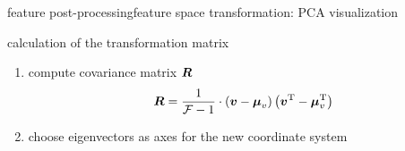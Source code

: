 		\begin{frame}{feature post-processing}{feature space transformation: PCA visualization}
			
			\vspace{-5mm}
			\pause
			calculation of the transformation matrix
			\begin{enumerate}
				\item	compute covariance matrix $\mat{R}$
					\begin{equation*}
						\mat{R} = \frac{1}{\mathcal{F}-1}\cdot \left(\vec{v} - \vec{\mu}_v\right)\left(\vec{v}^\mathrm{T} - \vec{\mu}^\mathrm{T}_v\right)
					\end{equation*}
				\item	choose eigenvectors as axes for the new coordinate system
			\end{enumerate}
		\end{frame}

